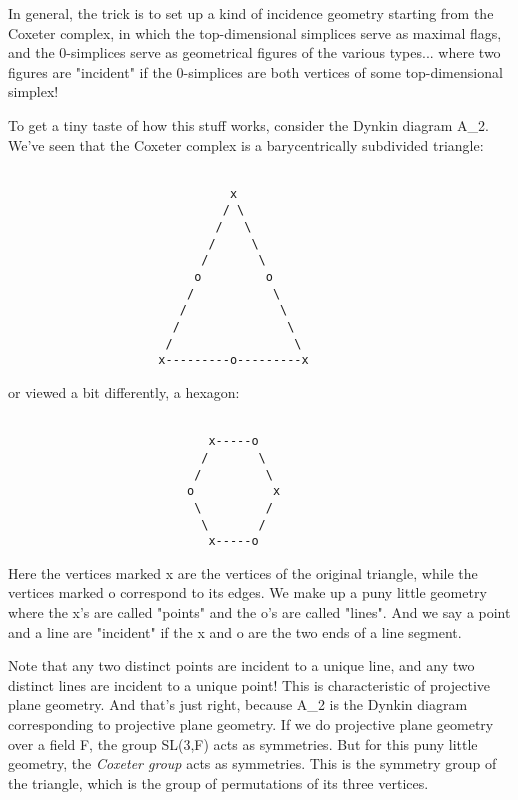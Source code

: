 In general, the trick is to set up a kind of incidence geometry starting
from the Coxeter complex, in which the top-dimensional simplices serve
as maximal flags, and the 0-simplices serve as geometrical figures of
the various types... where two figures are "incident" if the
0-simplices are both vertices of some top-dimensional simplex!

To get a tiny taste of how this stuff works, consider the Dynkin diagram
A_{2}.  We've seen that the Coxeter complex is a barycentrically
subdivided triangle:


\begin{verbatim}

                               x
                              / \
                             /   \
                            /     \
                           /       \
                          o         o
                         /           \
                        /             \
                       /               \
                      /                 \
                     x---------o---------x
\end{verbatim}
    
or viewed a bit differently, a hexagon:



\begin{verbatim}

                            x-----o
                           /       \
                          /         \
                         o           x
                          \         /
                           \       /
                            x-----o
\end{verbatim}
    
Here the vertices marked x are the vertices of the original triangle,
while the vertices marked o correspond to its edges.  We make up a puny
little geometry where the x's are called "points" and the o's
are called "lines".  And we say a point and a line are
"incident" if the x and o are the two ends of a line segment.

Note that any two distinct points are incident to a unique line, and 
any two distinct lines are incident to a unique point!  This is
characteristic of projective plane geometry.  And that's just right,
because A_{2} is the Dynkin diagram corresponding to projective plane
geometry.  If we do projective plane geometry over a field F, the group
SL(3,F) acts as symmetries.  But for this puny little geometry, the
\emph{Coxeter group} acts as symmetries.  This is the symmetry group of the
triangle, which is the group of permutations of its three vertices.  
                         
